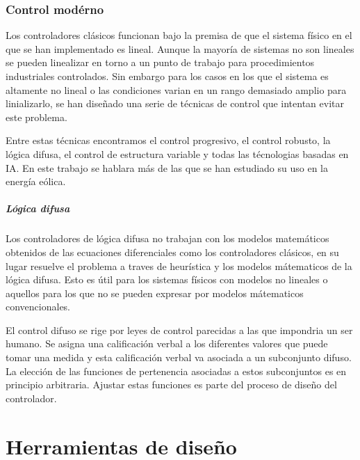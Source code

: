 \documentclass{book}
\begin{document}
	\subsection{Control mod\'erno}

Los controladores cl\'asicos funcionan bajo la premisa de que el sistema f\'isico en el que se han implementado es lineal. Aunque la mayor\'ia de sistemas no son lineales se pueden linealizar en torno a un punto de trabajo para procedimientos industriales controlados. Sin embargo para los casos en los que el sistema es altamente no lineal o las condiciones varian en un rango demasiado amplio para linializarlo, se han diseñado una serie de t\'ecnicas de control que intentan evitar este problema.  \par

Entre estas t\'ecnicas encontramos el control progresivo, el control robusto, la l\'ogica difusa, el control de estructura variable y todas las t\'ecnologias basadas en IA. En este trabajo se hablara m\'as de las que se han estudiado su uso en la energ\'ia e\'olica. \par

		\paragraph{L\'ogica difusa}

Los controladores de l\'ogica difusa no trabajan con los modelos matem\'aticos obtenidos de las ecuaciones diferenciales como los controladores cl\'asicos, en su lugar resuelve el problema a traves de heur\'istica y los modelos m\'atematicos de la l\'ogica difusa. Esto es \'util para los sistemas f\'isicos con modelos no lineales o aquellos para los que no se pueden expresar por modelos m\'atematicos convencionales. \par

El control difuso se rige por leyes de control parecidas a las que impondria un ser humano. Se asigna una calificaci\'on verbal a los diferentes valores que puede tomar una medida y esta calificaci\'on verbal va asociada a un subconjunto difuso. La elecci\'on de las funciones de pertenencia asociadas a estos subconjuntos es en principio arbitraria. Ajustar estas funciones es parte del proceso de diseño del controlador. \par


\chapter{Herramientas de diseño}
\end{document}
